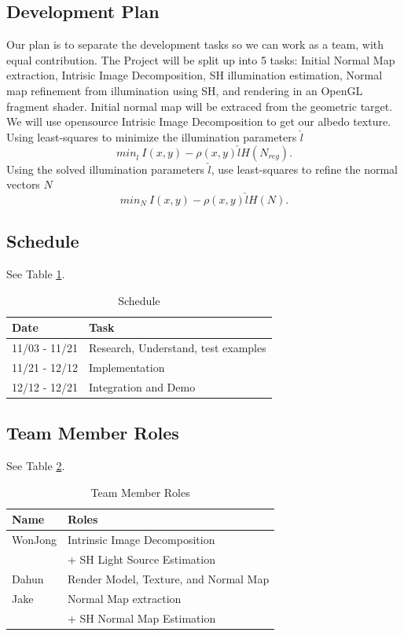 \documentclass[10pt,twocolumn,letterpaper]{article}
\begin{document}
\subsection{Development Plan} 
Our plan is to separate the development tasks so we can work as a team, with equal contribution. The Project will be split up into 5 tasks: Initial Normal Map extraction, Intrisic Image Decomposition, SH illumination estimation, Normal map refinement from illumination using SH, and rendering in an OpenGL fragment shader. Initial normal map will be extraced from the geometric target. We will use opensource Intrisic Image Decomposition to get our albedo texture. Using least-squares to minimize the illumination parameters $\hat{l}$
\begin{equation}
min_{\hat{l}}\ I(x,y) - \rho(x,y)\hat{l}H(N_{reg}).
\end{equation}
Using the solved illumination parameters $\hat{l}$, use least-squares to refine the normal vectors $N$
\begin{equation}
min_{N}\ I(x,y) - \rho(x,y)\hat{l}H(N).
\end{equation}


\subsection{Schedule}
See Table \ref{tab:sched}.
\begin{table}[h]
	\begin{tabular}{l|l}
		\textbf{Date} & Task \\
		\hline
		11/03 - 11/21 & Research, Understand, test examples \\
		11/21 - 12/12 & Implementation \\
		12/12 - 12/21 & Integration and Demo \\
		\hline
	\end{tabular}
	\caption{Schedule}
	\label{tab:sched}
\end{table}

\subsection{Team Member Roles}
See Table \ref{tab:roles}.
\begin{table}[h]
	\begin{tabular}{l|l}
		\textbf{Name} & Roles \\
		\hline
		WonJong & Intrinsic Image Decomposition \\&+ SH Light Source Estimation \\
		Dahun & Render Model, Texture, and Normal Map \\
		Jake & Normal Map extraction \\&+ SH Normal Map Estimation \\
		\hline
	\end{tabular}
	\caption{Team Member Roles}
	\label{tab:roles}
\end{table}
\end{document}
